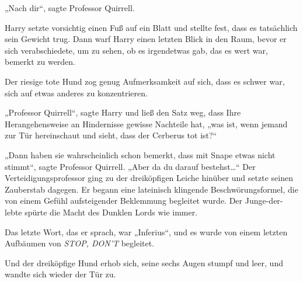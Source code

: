 „Nach dir“, sagte Professor Quirrell.

Harry setzte vorsichtig einen Fuß auf ein Blatt und stellte fest, dass es tatsächlich sein Gewicht trug. Dann warf Harry einen letzten Blick in den Raum, bevor er sich verabschiedete, um zu sehen, ob es irgendetwas gab, das es wert war, bemerkt zu werden.

Der riesige tote Hund zog genug Aufmerksamkeit auf sich, dass es schwer war, sich auf etwas anderes zu konzentrieren.

„Professor Quirrell“, sagte Harry und ließ den Satz weg, dass Ihre Herangehensweise an Hindernisse gewisse Nachteile hat, „was ist, wenn jemand zur Tür hereinschaut und sieht, dass der Cerberus tot ist?“

„Dann haben sie wahrscheinlich schon bemerkt, dass mit Snape etwas nicht stimmt“, sagte Professor Quirrell. „Aber da du darauf bestehst…“
Der Verteidigungsprofessor ging zu der dreiköpfigen Leiche hinüber und setzte seinen Zauberstab dagegen. Er begann eine lateinisch klingende Beschwörungsformel, die von einem Gefühl aufsteigender Beklemmung begleitet wurde. Der Junge-der-lebte spürte die Macht des Dunklen Lords wie immer.

Das letzte Wort, das er sprach, war „Inferius“, und es wurde von einem letzten Aufbäumen von \emph{STOP, DON’T} begleitet.

Und der dreiköpfige Hund erhob sich, seine sechs Augen stumpf und leer, und wandte sich wieder der Tür zu.

